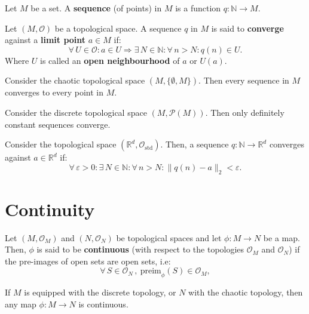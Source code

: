 \documentclass[root.tex]{subfiles}
\begin{document}
\begin{mydef}
  Let $M$ be a set. A \textbf{sequence} (of points) in $M$ is a function $q : \mathbb{N} \to  M$.
\end{mydef}

\begin{mydef}
Let $(M,\mathcal{O})$ be a topological space. A sequence $q$ in $M$ is said to \textbf{converge} against a \textbf{limit point} $a\in M$ if:
$$
\forall \, U \in \mathcal{O} : a \in U \Rightarrow \exists \, N \in \mathbb{N} : \forall \, n > N : q(n) \in U.
$$
Where $U$ is called an \textbf{open neighbourhood} of $a$ or $U(a)$. 
\end{mydef}

\begin{myex}
  Consider the chaotic topological space $(M,\{\emptyset,M\})$. Then every sequence in $M$ converges to every point in $M$. 
\end{myex}

\begin{myex}
  Consider the discrete topological space $(M,\mathcal{P}(M))$. Then only definitely constant sequences converge. 
\end{myex}

\begin{theorem}
Consider the topological space $(\mathbb{R}^d,\mathcal{O}_\mathrm{std})$. Then, a sequence $q: \mathbb{N} \to \mathbb{R}^d$ converges against $a\in \mathbb{R}^d$ if:
$$
\forall\, \varepsilon >0 : \exists \, N \in \mathbb{N} : \forall \, n > N : \|q(n)-a\|_2<\varepsilon.
$$
\end{theorem}

\section{Continuity}

\begin{mydef}
Let $(M,\mathcal{O}_M)$ and $(N,\mathcal{O}_N)$ be topological spaces and let $\phi: M\to N$ be a map. Then, $\phi$ is said to be \textbf{continuous} (with respect to the topologies $\mathcal{O}_M$ and $\mathcal{O}_N$) if the pre-images of open sets are open sets, i.e:
$$
\forall \, S \in \mathcal{O}_N \, , \ \mathrm{preim}_\phi(S) \in \mathcal{O}_M ,
$$

\end{mydef}

\begin{myex}
If $M$ is equipped with the discrete topology, or $N$ with the chaotic topology, then any map $\phi: M \to N$ is continuous. 
\end{myex}
\end{document}
